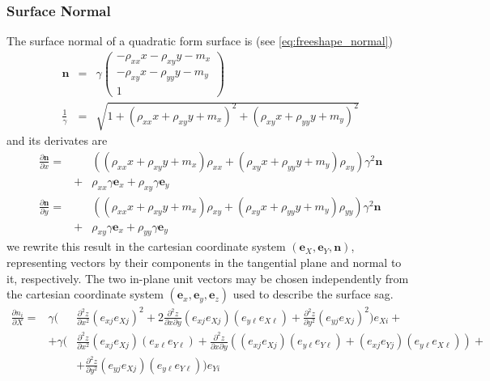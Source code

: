 \documentclass[12pt,a4paper,twoside,openright,BCOR10mm,headsepline,titlepage,abstracton,chapterprefix,final]{scrreprt}
\newcommand\Vector[1]{{\mathbf{#1}}}
\begin{document}
\subsubsection{Surface Normal}
The surface normal of a quadratic form surface is (see \eqref{eq:freeshape_normal})
\begin{eqnarray}
 \Vector{n} &=& \gamma
 \begin{pmatrix}
  - \rho_{xx} x - \rho_{xy} y - m_x
  \\
  - \rho_{xy} x - \rho_{yy} y - m_y
  \\
  1
  \end{pmatrix}
  \\
  \frac{1}{\gamma} &=& \sqrt{ 1 + \left( \rho_{xx} x + \rho_{xy} y + m_x \right)^2 + \left( \rho_{xy} x + \rho_{yy} y + m_y \right)^2}
\end{eqnarray}
and its derivates are
\begin{eqnarray}
 \frac{\partial \Vector{n}}{\partial x} =&&
  \left(
     (\rho_{xx} x + \rho_{xy} y + m_x) \rho_{xx}
   + (\rho_{xy} x + \rho_{yy} y + m_y) \rho_{xy}
  \right)
  \gamma^2 \Vector{n}
  \nonumber\\
  &+&
  \rho_{xx} \gamma \Vector{e}_x
  +
  \rho_{xy} \gamma \Vector{e}_y
\\
 \frac{\partial \Vector{n}}{\partial y} =&&
  \left(
     (\rho_{xx} x + \rho_{xy} y + m_x) \rho_{xy}
   + (\rho_{xy} x + \rho_{yy} y + m_y) \rho_{yy}
  \right)
  \gamma^2 \Vector{n}
  \nonumber\\
  &+&
  \rho_{xy} \gamma \Vector{e}_x
  +
  \rho_{yy} \gamma \Vector{e}_y
\end{eqnarray}
we rewrite this result in the cartesian coordinate system $(\Vector{e}_X, \Vector{e}_Y, \Vector{n})$,
representing vectors by their components in the tangential plane and normal to it, respectively.
The two in-plane unit vectors may be chosen independently 
from the cartesian coordinate system $(\Vector{e}_x, \Vector{e}_y, \Vector{e}_z)$
used to describe the surface sag.
\begin{eqnarray}
 \frac{\partial n_i}{\partial X} = &\gamma \Bigg(&
     \frac{\partial^2 z}{\partial x^2} 
     (e_{xj} e_{Xj})^2
   +2\frac{\partial^2 z}{\partial x \partial y}
     (e_{xj} e_{Xj})(e_{y\ell}e_{X\ell})
   + \frac{\partial^2 z}{\partial y^2}
     (e_{yj}e_{Xj})^2
 \Bigg) e_{Xi} +
\nonumber\\
 &+ \gamma \Bigg(&
     \frac{\partial^2 z}{\partial x^2}
     (e_{xj} e_{Xj})(e_{x\ell}e_{Y\ell})
   + \frac{\partial^2 z}{\partial x \partial y}
     \left( (e_{xj} e_{Xj})(e_{y\ell}e_{Y\ell}) + (e_{xj} e_{Yj})(e_{y\ell}e_{X\ell}) \right) + 
 \nonumber\\
  &&
   + \frac{\partial^2 z}{\partial y^2}
     (e_{yj}e_{Xj})(e_{y\ell}e_{Y\ell})
 \Bigg) e_{Yi}
 \label{eq:derivative_of_surface_normal_in_XY_coordinates}
\end{eqnarray}
\end{document}
